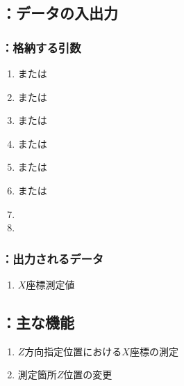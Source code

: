\subsection{\MXIface：データの入出力}

\subsubsection{\MXIface：格納する引数}
\begin{enumerate}[label*=\sarrow]
\item \PMTopOutcutACWidth または\PMBottomOutcutACWidth
\item \PMTopEndACID または\PMBottomEndACID
\item \PMTopEndFaceInChamferLength または\PMBottomEndFaceInChamferLength
\item \PMTopOutcutAsideThickness または\PMBottomOutcutAsideThickness
\item \PMTopAlocationLength または\PMBottomAlocationLength
\item \PMTopReAlocationLength または\PMBottomReAlocationLength
\item \PMCenterCurvatureRadius
\item \PMPlatingThk
\end{enumerate}

\subsubsection{\MXIface：出力されるデータ}
\begin{enumerate}[label*=\sarrow]
\item \OutcutCenter$X$座標測定値
\end{enumerate}



\subsection{\MXIface：主な機能}
\begin{enumerate}[label*=\sarrow]
\item $Z$方向指定位置における\OutcutCenter$X$座標の測定
\item 測定箇所$Z$位置の変更
\end{enumerate}


